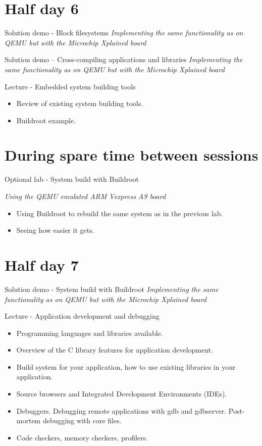 \documentclass[a4paper,12pt,obeyspaces,spaces,hyphens]{article}
\begin{document}
\section{Half day 6}

\feagendaonecolumn
{Solution demo - Block filesystems}
{
  {\em Implementing the same functionality as on QEMU but with the Microchip Xplained board}
}

\feagendaonecolumn
{Solution demo – Cross-compiling applications and libraries}
{
  {\em Implementing the same functionality as on QEMU but with the Microchip Xplained board}
}

\feagendaonecolumn
{Lecture - Embedded system building tools}
{
  \begin{itemize}
  \item Review of existing system building tools.
  \item Buildroot example.
  \end{itemize}
}

\section{During spare time between sessions}

\feagendaonecolumn
{Optional lab - System build with Buildroot}
{
  {\em Using the QEMU emulated ARM Vexpress A9 board}
  \begin{itemize}
  \item Using Buildroot to rebuild the same system as in the previous lab.
  \item Seeing how easier it gets.
  \end{itemize}
}

\section{Half day 7}

\feagendaonecolumn
{Solution demo - System build with Buildroot}
{
  {\em Implementing the same functionality as on QEMU but with the Microchip Xplained board}
}

\feagendaonecolumn
{Lecture - Application development and debugging}
{
  \begin{itemize}
  \item Programming languages and libraries available.
  \item Overview of the C library features for application development.
  \item Build system for your application,
        how to use existing libraries in your application.
  \item Source browsers and Integrated Development Environments (IDEs).
  \item Debuggers. Debugging remote applications with gdb and gdbserver.
        Post-mortem debugging with core files.
  \item Code checkers, memory checkers, profilers.
  \end{itemize}
}
\end{document}
